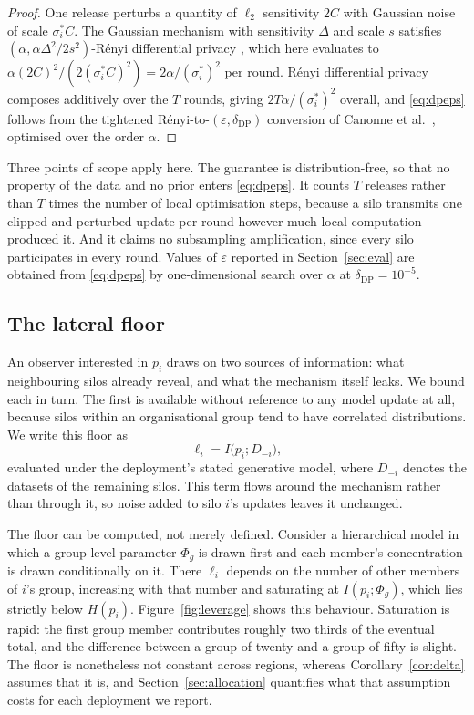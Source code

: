 \documentclass[acmsmall,screen,review,anonymous]{acmart}
\theoremstyle{acmdefinition}%
\begin{document}
\begin{proof}
One release perturbs a quantity of $\ell_2$ sensitivity $2C$ with Gaussian noise of
scale $\sigma^{\ast}_i C$. The Gaussian mechanism with sensitivity $\Delta$ and
scale $s$ satisfies $(\alpha, \alpha \Delta^2 / 2s^2)$-R\'enyi differential privacy
\cite{mironov2017rdp}, which here evaluates to $\alpha (2C)^2 / (2 (\sigma^{\ast}_i
C)^2) = 2\alpha/(\sigma^{\ast}_i)^2$ per round. R\'enyi differential privacy
composes additively over the $T$ rounds, giving $2 T \alpha/(\sigma^{\ast}_i)^2$
overall, and \eqref{eq:dpeps} follows from the tightened R\'enyi-to-$(\varepsilon,
\delta_{\mathrm{DP}})$ conversion of Canonne et al.\ \cite{canonne2020discrete},
optimised over the order $\alpha$.
\end{proof}

Three points of scope apply here. The guarantee is distribution-free, so that no
property of the data and no prior enters \eqref{eq:dpeps}. It counts $T$ releases
rather than $T$ times the number of local optimisation steps, because a silo
transmits one clipped and perturbed update per round however much local
computation produced it. And it claims no subsampling amplification, since every
silo participates in every round. Values of $\varepsilon$ reported in
Section~\ref{sec:eval} are obtained from \eqref{eq:dpeps} by one-dimensional
search over $\alpha$ at $\delta_{\mathrm{DP}} = 10^{-5}$.

\subsection{The lateral floor}

An observer interested in $p_i$ draws on two sources of information: what
neighbouring silos already reveal, and what the mechanism itself leaks. We bound
each in turn. The first is available without reference to any model update at all,
because silos within an organisational group tend to have correlated
distributions. We write this floor as
\begin{equation}
\ell_i = I\big(p_i ; D_{-i}\big),
\end{equation}
evaluated under the deployment's stated generative model, where $D_{-i}$ denotes
the datasets of the remaining silos. This term flows around the mechanism rather
than through it, so noise added to silo $i$'s updates leaves it unchanged.

The floor can be computed, not merely defined. Consider a hierarchical model in
which a group-level parameter $\Phi_g$ is drawn first and each member's
concentration is drawn conditionally on it. There $\ell_i$ depends on the number of
other members of $i$'s group, increasing with that number and saturating at $I(p_i
; \Phi_g)$, which lies strictly below $H(p_i)$. Figure~\ref{fig:leverage} shows
this behaviour. Saturation is rapid: the first group member contributes roughly two
thirds of the eventual total, and the difference between a group of twenty and a
group of fifty is slight. The floor is nonetheless not constant across regions,
whereas Corollary~\ref{cor:delta} assumes that it is, and
Section~\ref{sec:allocation} quantifies what that assumption costs for each
deployment we report.
\end{document}
